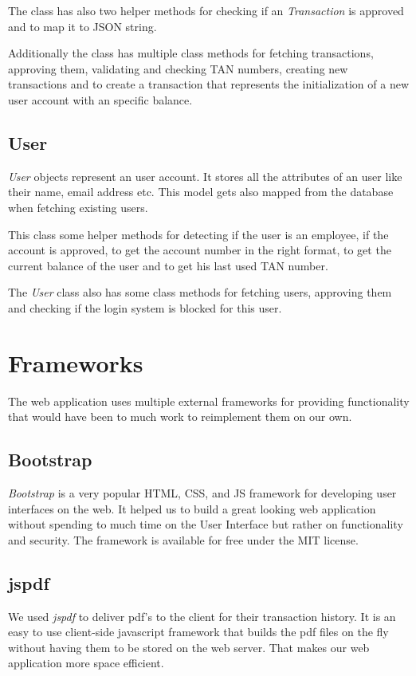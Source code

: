 \documentclass[headsepline,footsepline,footinclude=false,oneside,fontsize=11pt,paper=a4,listof=totoc,bibliography=totoc]{scrbook} %
\begin{document}
The class has also two helper methods for checking if an \textit{Transaction} is approved and to map it to JSON string.

Additionally the class has multiple class methods for fetching transactions, approving them, validating and checking TAN numbers, creating new transactions and to create a transaction that represents the initialization of a new user account with an specific balance.

\subsection{User}

\textit{User} objects represent an user account. It stores all the attributes of an user like their name, email address etc. This model gets also mapped from the database when fetching existing users.

This class some helper methods for detecting if the user is an employee, if the account is approved, to get the account number in the right format, to get the current balance of the user and to get his last used TAN number.

The \textit{User} class also has some class methods for fetching users, approving them and checking if the login system is blocked for this user.

\section{Frameworks}

The web application uses multiple external frameworks for providing functionality that would have been to much work to reimplement them on our own.

\subsection{Bootstrap}

\textit{Bootstrap} is a very popular HTML, CSS, and JS framework for developing user interfaces on the web. It helped us to build a great looking web application without spending to much time on the User Interface but rather on functionality and security.
The framework is available for free under the MIT license.

\subsection{jspdf}

We used \textit{jspdf} to deliver pdf's to the client for their transaction history. It is an easy to use client-side javascript framework that builds the pdf files on the fly without having them to be stored on the web server. That makes our web application more space efficient.
\end{document}
